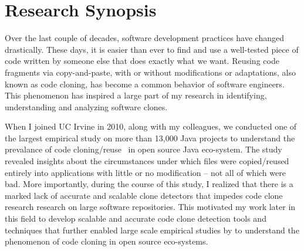 \documentclass[a4paper]{article}
\begin{document}

\section*{Research Synopsis}


Over the last couple of decades, software development
practices have changed drastically. 
These days, it is easier than ever to find and 
use a well-tested piece of code written by someone else that
does exactly what we want. Reusing code
fragments via copy-and-paste, with or without modifications
or adaptations, also known as code cloning, has become a common behavior of software engineers. This phenomenon has inspired a large part of my research in identifying, understanding and analyzing software clones. 


When I joined UC Irvine in 2010, along with my colleagues, we conducted  one of the largest empirical study
on more than 13,000 Java projects to understand the prevalance of code cloning/reuse~\cite{filecloning} in open source Java eco-system.
The study revealed insights about the circumstances under which files were copied/reused entirely into applications with little or no modification -- not all of which were bad. 
More importantly, during the course of this study, I realized that there is a marked lack of accurate and scalable clone detectors that impedes code clone research research on large software repositories. 
This motivated my work later in this field to develop scalable and accurate code clone detection tools and techniques that further enabled large scale empirical studies by to understand the phenomenon of code cloning in open source eco-systems.

\end{document}
